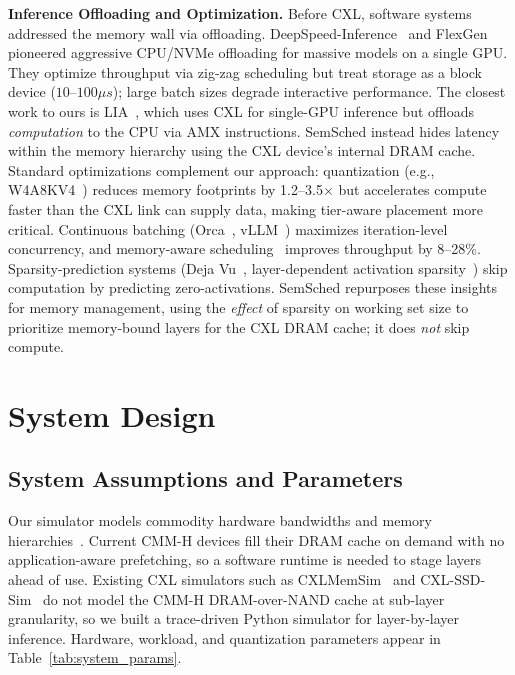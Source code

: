 \documentclass[10pt,conference,letterpaper]{IEEEtran}
\begin{document}
\noindent
\textbf{Inference Offloading and Optimization.}
Before CXL, software systems addressed the memory wall via offloading. DeepSpeed-Inference~\cite{aminabadi2022deepspeed} and FlexGen~\cite{sheng2023flexgen} pioneered aggressive CPU/NVMe offloading for massive models on a single GPU. They optimize throughput via zig-zag scheduling but treat storage as a block device ($10\text{--}100\mu s$); large batch sizes degrade interactive performance.
The closest work to ours is LIA~\cite{kim2025lia}, which uses CXL for single-GPU inference but offloads \emph{computation} to the CPU via AMX instructions. SemSched instead hides latency within the memory hierarchy using the CXL device's internal DRAM cache. Standard optimizations complement our approach: quantization (e.g., W4A8KV4~\cite{lin2025qserve}) reduces memory footprints by 1.2--3.5$\times$ but accelerates compute faster than the CXL link can supply data, making tier-aware placement more critical. Continuous batching (Orca~\cite{yu2022orca}, vLLM~\cite{kwon2023efficient}) maximizes iteration-level concurrency, and memory-aware scheduling~\cite{pang2025optimizing} improves throughput by 8--28\%.
Sparsity-prediction systems (Deja Vu~\cite{liu2023dejavu}, layer-dependent activation sparsity~\cite{wild2024uncovering}) skip computation by predicting zero-activations. SemSched repurposes these insights for memory management, using the \emph{effect} of sparsity on working set size to prioritize memory-bound layers for the CXL DRAM cache; it does \emph{not} skip compute.

\section{System Design}
\label{sec:systemdesign}

\subsection{System Assumptions and Parameters}
\label{sec:assumptions}
\noindent
Our simulator models commodity hardware bandwidths and memory hierarchies~\cite{wang2025performance,soltaniyeh2025revisiting}. Current CMM-H devices fill their DRAM cache on demand with no application-aware prefetching, so a software runtime is needed to stage layers ahead of use. Existing CXL simulators such as CXLMemSim~\cite{yang2023cxlmemsim} and CXL-SSD-Sim~\cite{wang2025full} do not model the CMM-H DRAM-over-NAND cache at sub-layer granularity, so we built a trace-driven Python simulator for layer-by-layer inference. Hardware, workload, and quantization parameters appear in Table~\ref{tab:system_params}.
\end{document}
